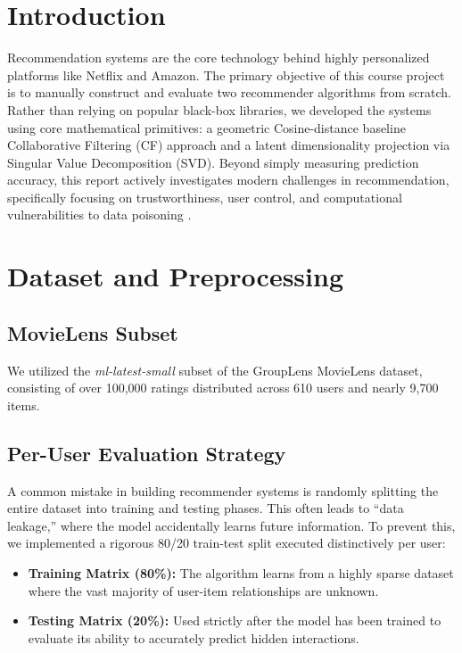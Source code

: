 \documentclass[sigconf,authordraft,nonacm]{acmart}
\begin{document}
\maketitle

\section{Introduction}
Recommendation systems are the core technology behind highly personalized platforms like Netflix and Amazon. The primary objective of this course project is to manually construct and evaluate two recommender algorithms from scratch. Rather than relying on popular black-box libraries, we developed the systems using core mathematical primitives: a geometric Cosine-distance baseline Collaborative Filtering (CF) approach and a latent dimensionality projection via Singular Value Decomposition (SVD). Beyond simply measuring prediction accuracy, this report actively investigates modern challenges in recommendation, specifically focusing on trustworthiness, user control, and computational vulnerabilities to data poisoning \cite{koren2009matrix}.

\section{Dataset and Preprocessing}
\subsection{MovieLens Subset}
We utilized the \textit{ml-latest-small} subset of the GroupLens MovieLens dataset, consisting of over 100,000 ratings distributed across 610 users and nearly 9,700 items. 

\subsection{Per-User Evaluation Strategy}
A common mistake in building recommender systems is randomly splitting the entire dataset into training and testing phases. This often leads to ``data leakage,'' where the model accidentally learns future information. To prevent this, we implemented a rigorous 80/20 train-test split executed distinctively per user:
\begin{itemize}
    \item \textbf{Training Matrix (80\%):} The algorithm learns from a highly sparse dataset where the vast majority of user-item relationships are unknown.
    \item \textbf{Testing Matrix (20\%):} Used strictly after the model has been trained to evaluate its ability to accurately predict hidden interactions.
\end{itemize}
\end{document}
